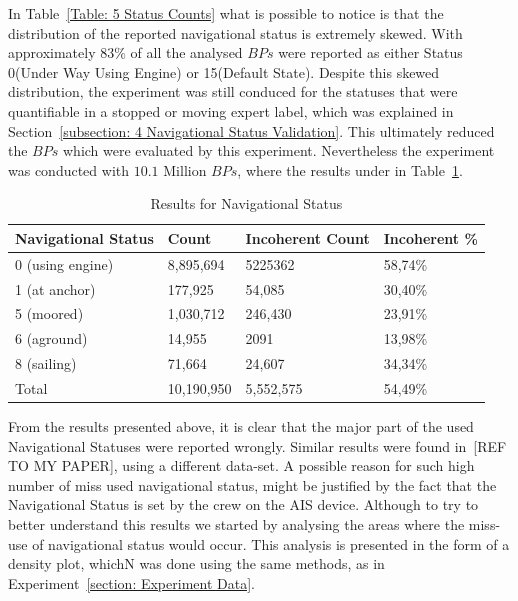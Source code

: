 In Table~\ref{Table: 5 Status Counts} what is possible to notice is that the distribution of the reported navigational status is extremely skewed. With approximately $83\%$ of all the analysed $BPs$ were reported as either Status 0(Under Way Using Engine) or 15(Default State). 
Despite this skewed distribution, the experiment was still conduced for the statuses that were quantifiable in a stopped or moving expert label, which was explained in Section~\ref{subsection: 4 Navigational Status Validation}. 
This ultimately reduced the $BPs$ which were evaluated by this experiment. Nevertheless the experiment was conducted with $10.1$ Million $BPs$, where the results under in Table~\ref{Table: 5 Status Results}.
  
\begin{table}[H]
\centering
\caption{Results for Navigational Status}
\label{Table: 5 Status Results}
\begin{tabular}{@{}llll@{}}
\toprule
Navigational Status & Count & Incoherent Count & Incoherent \% \\ \midrule
0 (using engine) & 8,895,694 & 5225362 & 58,74\% \\
1 (at anchor) & 177,925 & 54,085 & 30,40\% \\
5 (moored) & 1,030,712 & 246,430 & 23,91\% \\
6 (aground) & 14,955 & 2091 & 13,98\% \\
8 (sailing) & 71,664 & 24,607 & 34,34\% \\
Total & 10,190,950 & 5,552,575 & 54,49\% \\ \bottomrule
\end{tabular}
\end{table}

From the results presented above, it is clear that the major part of the used Navigational Statuses were reported wrongly. Similar results were found in~[REF TO MY PAPER], using a different data-set. A possible reason for such high number of miss used navigational status, might be justified by the fact that the Navigational Status is set by the crew on the AIS device. 
Although to try to better understand this results we started by analysing the areas where the miss-use of navigational status would occur. This analysis is presented in the form of a density plot, whichN was done using the same methods, as in Experiment~\ref{section: Experiment Data}.

